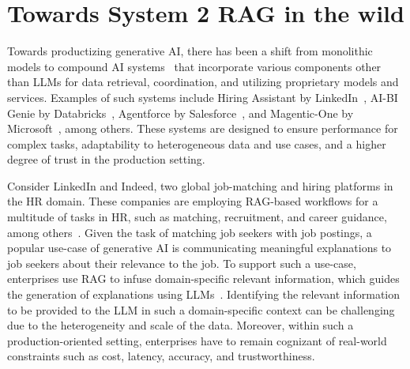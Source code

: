 
\section{Towards System 2 RAG in the wild}


Towards productizing generative AI, there has been a shift from monolithic models to compound AI systems~\cite{kandogan2024blueprint} that incorporate various components other than LLMs for data retrieval, coordination, and utilizing proprietary models and services. Examples of such systems include Hiring Assistant by LinkedIn~\cite{linkedin-assistant}, AI-BI Genie by Databricks~\cite{databricks-aibi}, Agentforce by Salesforce~\cite{salesforce-agentforce}, and Magentic-One by Microsoft~\cite{microsoft-magentic}, among others. These systems are designed to ensure performance for complex tasks, adaptability to heterogeneous data and use cases, and a higher degree of trust in the production setting.

Consider LinkedIn and Indeed, two global job-matching and hiring platforms in the HR domain. These companies are employing RAG-based workflows for a multitude of tasks in HR, such as matching, recruitment, and career guidance, among others~\cite{indeed-ai-blog, linkedin-ai-blog}. 
Given the task of matching job seekers with job postings, a popular use-case of generative AI is communicating meaningful explanations to job seekers about their relevance to the job. To support such a use-case, enterprises use RAG to infuse domain-specific relevant information, which guides the generation of explanations using LLMs~\cite{indeed-ai-blog}. Identifying the relevant information to be provided to the LLM in such a domain-specific context can be challenging due to the heterogeneity and scale of the data. Moreover, within such a production-oriented setting, enterprises have to remain cognizant of real-world constraints such as cost, latency, accuracy, and trustworthiness.



